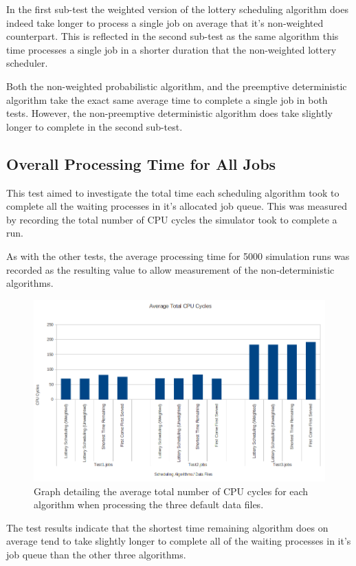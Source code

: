 \documentclass{acm_proc_article-sp}
\begin{document}
In the first sub-test the weighted version of the lottery scheduling algorithm does indeed take longer to process a single job on average that it's non-weighted counterpart. This is reflected in the second sub-test as the same algorithm this time processes a single job in a shorter duration that the non-weighted lottery scheduler. 

Both the non-weighted probabilistic algorithm, and the preemptive deterministic algorithm take the exact same average time to complete a single job in both tests. However, the non-preemptive deterministic algorithm does take slightly longer to complete in the second sub-test.

\subsection{Overall Processing Time for All Jobs}

This test aimed to investigate the total time each scheduling algorithm took to complete all the waiting processes in it's allocated job queue. This was measured by recording the total number of CPU cycles the simulator took to complete a run. 

As with the other tests, the average processing time for 5000 simulation runs was recorded as the resulting value to allow measurement of the non-deterministic algorithms.

\begin{figure}[!htbp]
\centering
\includegraphics[scale=0.27]{graph_cpucycles1.png}
\caption{Graph detailing the average total number of CPU cycles for each algorithm when processing the three default data files.}
\end{figure} 

The test results indicate that the shortest time remaining algorithm does on average tend to take slightly longer to complete all of the waiting processes in it's job queue than the other three algorithms. 
\end{document}
